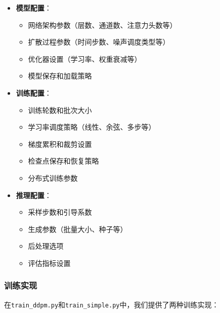 \documentclass{ctexart}
\begin{document}
\begin{itemize}
    \item \textbf{模型配置}：
    \begin{itemize}
        \item 网络架构参数（层数、通道数、注意力头数等）
        \item 扩散过程参数（时间步数、噪声调度类型等）
        \item 优化器设置（学习率、权重衰减等）
        \item 模型保存和加载策略
    \end{itemize}
    
    \item \textbf{训练配置}：
    \begin{itemize}
        \item 训练轮数和批次大小
        \item 学习率调度策略（线性、余弦、多步等）
        \item 梯度累积和裁剪设置
        \item 检查点保存和恢复策略
        \item 分布式训练参数
    \end{itemize}
    
    \item \textbf{推理配置}：
    \begin{itemize}
        \item 采样步数和引导系数
        \item 生成参数（批量大小、种子等）
        \item 后处理选项
        \item 评估指标设置
    \end{itemize}
\end{itemize}

\subsubsection{训练实现} 
\noindent
在\texttt{train\_ddpm.py}和\texttt{train\_simple.py}中，我们提供了两种训练实现：
\end{document}
